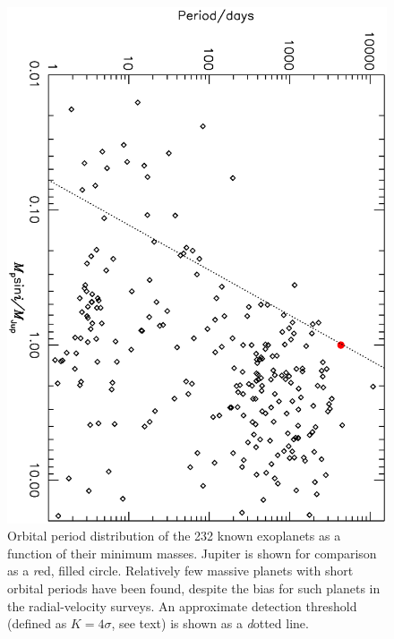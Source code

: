 \begin{figure}
\begin{center}
\centering
\includegraphics[angle=90,width=.90\textwidth]{1_rvplanets}
\caption[Orbital period distribution of the 232 known exoplanets]{%
Orbital period distribution of the 232 known exoplanets as a function of their minimum masses.
Jupiter is shown for comparison as a {\textit red, filled circle}.
Relatively few massive planets with short orbital periods have been found, despite the bias for such planets in the radial-velocity surveys.
An approximate detection threshold (defined as $K=4\sigma$, see text) is shown as a {\textit dotted line}.%
}\label{cha:intro:sec:methods:sub:rv:fig:rv}
\end{center}
\end{figure}

